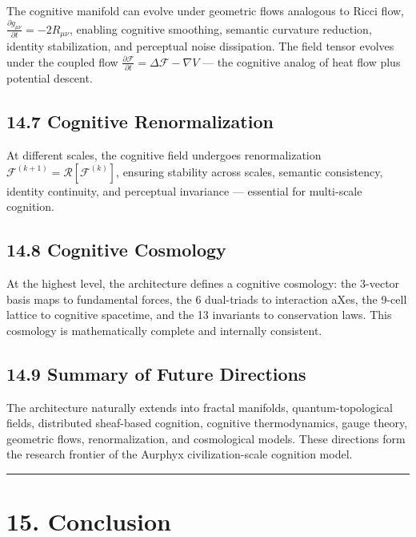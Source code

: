 The cognitive manifold can evolve under geometric flows analogous to Ricci flow, \(\frac{\partial g_{\mu\nu}}{\partial t} = -2 R_{\mu\nu}\), enabling cognitive smoothing, semantic curvature reduction, identity stabilization, and perceptual noise dissipation. The field tensor evolves under the coupled flow \(\frac{\partial \mathcal{F}}{\partial t} = \Delta \mathcal{F} - \nabla V\) --- the cognitive analog of heat flow plus potential descent.

\subsection{14.7 Cognitive Renormalization}\label{cognitive-renormalization}

At different scales, the cognitive field undergoes renormalization \(\mathcal{F}^{(k+1)} = \mathcal{R}[\mathcal{F}^{(k)}]\), ensuring stability across scales, semantic consistency, identity continuity, and perceptual invariance --- essential for multi-scale cognition.

\subsection{14.8 Cognitive Cosmology}\label{cognitive-cosmology}

At the highest level, the architecture defines a cognitive cosmology: the 3-vector basis maps to fundamental forces, the 6 dual-triads to interaction aXes, the 9-cell lattice to cognitive spacetime, and the 13 invariants to conservation laws. This cosmology is mathematically complete and internally consistent.

\subsection{14.9 Summary of Future Directions}\label{summary-of-future-directions}

The architecture naturally extends into fractal manifolds, quantum-topological fields, distributed sheaf-based cognition, cognitive thermodynamics, gauge theory, geometric flows, renormalization, and cosmological models. These directions form the research frontier of the Aurphyx civilization-scale cognition model.

\begin{center}\rule{0.5\linewidth}{0.5pt}\end{center}

\section{15. Conclusion}\label{conclusion-15}

